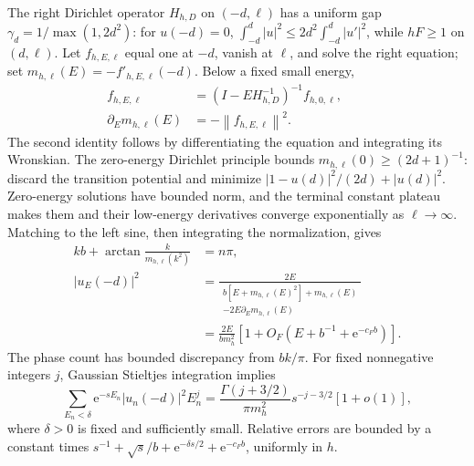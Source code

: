 \documentclass[aps,pra,reprint,superscriptaddress,longbibliography]{revtex4-2}
\newcommand{\ee}{\mathrm e}
\newcommand{\norm}[1]{\left\lVert#1\right\rVert}
\begin{document}
The right Dirichlet operator $H_{h,D}$ on $(-d,\ell)$ has a uniform
gap $\gamma_d=1/\max(1,2d^2)$: for $u(-d)=0$,
$\int_{-d}^d|u|^2\le2d^2\int_{-d}^d|u'|^2$, while $hF\ge1$
on $(d,\ell)$. Let $f_{h,E,\ell}$ equal one at $-d$, vanish at
$\ell$, and solve the right equation; set
$m_{h,\ell}(E)=-f'_{h,E,\ell}(-d)$. Below a fixed small energy,
\begin{equation}
 \begin{aligned}
 f_{h,E,\ell}&=(I-EH_{h,D}^{-1})^{-1}f_{h,0,\ell},\qquad\\
 \partial_E m_{h,\ell}(E)&=-\norm{f_{h,E,\ell}}^2.
 \end{aligned}                                         \label{eq:apode}
\end{equation}
The second identity follows by differentiating the equation and
integrating its Wronskian. The zero-energy Dirichlet principle bounds
$m_{h,\ell}(0)\ge(2d+1)^{-1}$: discard the transition potential and
minimize $|1-u(d)|^2/(2d)+|u(d)|^2$. Zero-energy solutions have bounded
norm, and the terminal constant plateau makes them and their
low-energy derivatives converge exponentially as $\ell\to\infty$.
Matching to the left sine, then integrating the normalization, gives
\begin{align}
 kb+\arctan\frac{k}{m_{h,\ell}(k^2)}&=n\pi,\nonumber\\
 |u_E(-d)|^2
 &=\frac{2E}{\begin{gathered}
 b[E+m_{h,\ell}(E)^2]+m_{h,\ell}(E)\\
                       -2E\partial_E m_{h,\ell}(E)
 \end{gathered}}\nonumber\\
 &=\frac{2E}{b m_h^2}
       [1+O_F(E+b^{-1}+\ee^{-c_Fb})].                    \label{eq:apamp}
\end{align}
The phase count has bounded discrepancy from $bk/\pi$. For fixed
nonnegative integers $j$, Gaussian Stieltjes integration implies
\begin{equation}
 \sum_{E_n<\delta}\ee^{-sE_n}|u_n(-d)|^2E_n^j
 =\frac{\Gamma(j+3/2)}{\pi m_h^2}s^{-j-3/2}[1+o(1)],    \label{eq:apmom}
\end{equation}
where $\delta>0$ is fixed and sufficiently small. Relative errors are
bounded by a constant times
$s^{-1}+\sqrt s/b+\ee^{-\delta s/2}+\ee^{-c_Fb}$, uniformly in $h$.
\end{document}
